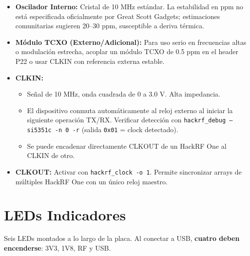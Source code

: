 \documentclass[11pt]{article}
\begin{document}
\begin{itemize}
    \item \textbf{Oscilador Interno:} Cristal de 10 MHz estándar. La estabilidad en ppm no está especificada oficialmente por Great Scott Gadgets; estimaciones comunitarias sugieren 20--30 ppm, susceptible a deriva térmica.
    \item \textbf{Módulo TCXO (Externo/Adicional):} Para uso serio en frecuencias altas o modulación estrecha, acoplar un módulo TCXO de 0.5 ppm en el header P22 o usar CLKIN con referencia externa estable.
    \item \textbf{CLKIN:}
    \begin{itemize}
        \item Señal de 10 MHz, onda cuadrada de 0 a 3.0 V. Alta impedancia.
        \item El dispositivo conmuta automáticamente al reloj externo al iniciar la siguiente operación TX/RX. Verificar detección con \texttt{hackrf\_debug --si5351c -n 0 -r} (salida \texttt{0x01} = clock detectado).
        \item Se puede encadenar directamente CLKOUT de un HackRF One al CLKIN de otro.
    \end{itemize}
    \item \textbf{CLKOUT:} Activar con \texttt{hackrf\_clock -o 1}. Permite sincronizar arrays de múltiples HackRF One con un único reloj maestro.
\end{itemize}

\section{LEDs Indicadores}

Seis LEDs montados a lo largo de la placa. Al conectar a USB, \textbf{cuatro deben encenderse}: 3V3, 1V8, RF y USB.
\end{document}
